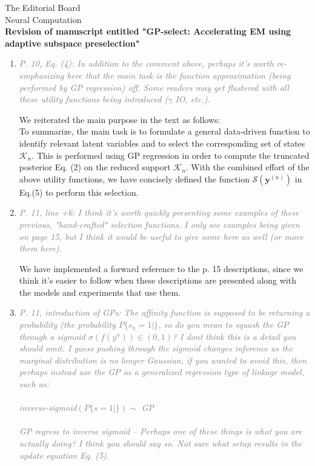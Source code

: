 \documentclass[10pt]{letter}
\newcommand{\rvr}[1]{\textcolor{gray}{#1}}
\renewcommand{\vec}[1]{{\mathbf{#1}}}
\newcommand{\Kn}{\mathcal{K}_{n}}
\begin{document}
\begin{letter}{
The Editorial Board\\
Neural Computation\\
\vspace{10mm}
\textbf{Revision of manuscript entitled "GP-select: Accelerating EM using adaptive
subspace preselection"}
}
\begin{enumerate}[topsep=3pt,itemsep=2ex,partopsep=1ex,parsep=1ex]
    \item \rvr{\emph{P. 10, Eq. (4): In addition to the comment above, perhaps it's worth re-emphasizing here that the main task is the function approximation (being performed by GP regression) off. Some readers may get flustered with all these utility functions being introduced ($\gamma$ IO, etc.).}}

We reiterated the main purpose in the text as follows:\\
To summarize, the main task is to formulate a general data-driven function to identify relevant latent variables and to select the corresponding set of states
$\Kn$. 
This is performed using GP regression in order to compute the truncated posterior Eq. (2) on the reduced support $\Kn$.
With the combined effort of the above utility functions, we have concisely defined the function $\mathcal{S}(\vec{y}^{(n)})$ in Eq.(5) to perform this selection.

    \item \rvr{\emph{P. 11, line +6: I think it's worth quickly presenting some examples of these previous, "hand-crafted"  selection functions. I only see examples being given on page 15, but I think it would be useful to give some here as well (or move them here).}}

We have implemented a forward reference to the p. 15 descriptions, since we think it's easier to follow when these descriptions are presented along with the models and experiments that use them.


    \item \rvr{\emph{P. 11, introduction of GPs: The affinity function is supposed to be returning a probability (the probability $P \{ s_h = 1 |   \}$, so do you mean to squash the GP through a sigmoid $\sigma(f(y^n)) \in (0,1)$? I dont think this is a detail you should omit. I guess pushing through the sigmoid changes inference as the marginal distribution is no longer Gaussian, if you wanted to avoid this, then perhaps instead use the GP as a generalized regression type of linkage model, such as:\\ \\
inverse-sigmoid$( P\{ s = 1 |   \} ) \sim$ GP \\ \\
GP regress to inverse sigmoid -- Perhaps one of these things is what you are actually doing? I think you should say so.
Not sure what setup results in the update equation 
Eq. (5).}}


\end{enumerate}
\end{letter}
\end{document}
